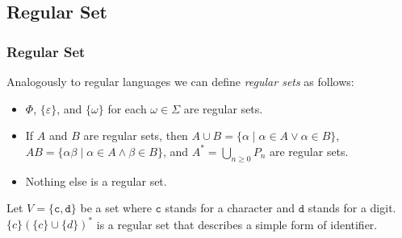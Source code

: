 \documentclass{beamer}
\theoremstyle{remark}
\newcommand{\emptystring}{\varepsilon}
\begin{document}
\subsection{Regular Set}
\begin{frame}
	\frametitle{Regular Set}

	\begin{definition}
		Analogously to regular languages we can define {\em regular sets} as follows:
		\begin{itemize}
			\item $\Phi$,  $\{\emptystring \}$, and $\{\omega\}$ for each $\omega \in \Sigma$ are regular sets.
			\item If $A$ and $B$ are regular sets, then $A \cup B = \{\alpha \mid \alpha \in A \lor \alpha \in B\}$,
			$AB = \{\alpha \beta \mid \alpha \in A \land \beta \in B\}$,
			and $A^* = \underset{n \ge 0}{\bigcup}P_n$ are regular sets.
			\item Nothing else is a regular set.
		\end{itemize}
	\end{definition}

	\pause
	
	\begin{example}
	Let $V = \{\mathtt{c}, \mathtt{d}\}$ be a set where $\mathtt{c}$ stands for a character and $\mathtt{d}$ stands for a digit.
	$\{c\} (\{c\} \cup \{d\})^*$ is a regular set that describes a simple form of identifier.
	\end{example}
\end{frame}
\end{document}
